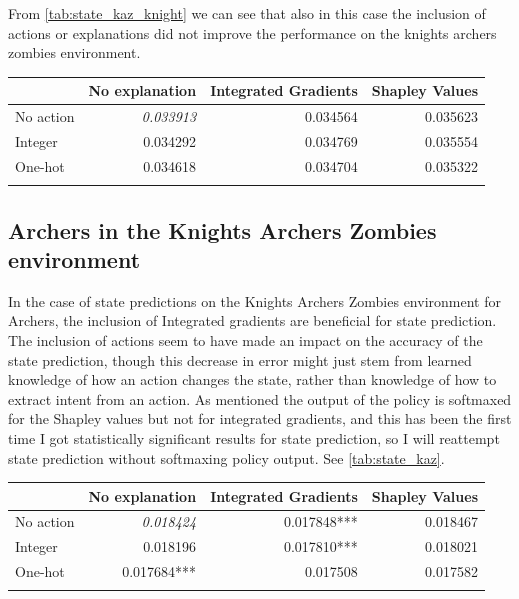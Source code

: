 \documentclass[UKenglish]{uiomasterthesis}
\begin{document}
From \cref{tab:state_kaz_knight} we can see that also in this case the inclusion of actions or explanations did not improve the performance on the knights archers zombies environment.

\begin{center}
\label{tab:state_kaz_knight}
\begin{tabular}{lrrr}
\toprule
 & No explanation & Integrated Gradients & Shapley Values \\
\midrule
No action & \textit{0.033913} & 0.034564 & 0.035623 \\
Integer & 0.034292 & 0.034769 & 0.035554 \\
One-hot & 0.034618 & 0.034704 & 0.035322 \\
\bottomrule
\addlinespace[2pt]
\multicolumn{3}{l}{\textsuperscript{***}$p<0.001$, 
  \textsuperscript{**}$p<0.01$, 
  \textsuperscript{*}$p<0.05$}
\end{tabular}
\end{center}


\subsection{Archers in the Knights Archers Zombies environment}

In the case of state predictions on the Knights Archers Zombies environment for Archers, the inclusion of Integrated gradients are beneficial for state prediction. The inclusion of actions seem to have made an impact on the accuracy of the state prediction, though this decrease in error might just stem from learned knowledge of how an action changes the state, rather than knowledge of how to extract intent from an action. As mentioned the output of the policy is softmaxed for the Shapley values but not for integrated gradients, and this has been the first time I got statistically significant results for state prediction, so I will reattempt state prediction without softmaxing policy output. See \cref{tab:state_kaz}.

\begin{center}
\label{tab:state_kaz}
\begin{tabular}{lrrr}
\toprule
 & No explanation & Integrated Gradients & Shapley Values \\
\midrule
No action & \textit{0.018424} & 0.017848*** & 0.018467 \\
Integer & 0.018196 & 0.017810*** & 0.018021 \\
One-hot & 0.017684*** & 0.017508 & 0.017582 \\
\bottomrule
\addlinespace[2pt]
\multicolumn{3}{l}{\textsuperscript{***}$p<0.001$, 
  \textsuperscript{**}$p<0.01$, 
  \textsuperscript{*}$p<0.05$}
\end{tabular}
\end{center}
\end{document}
